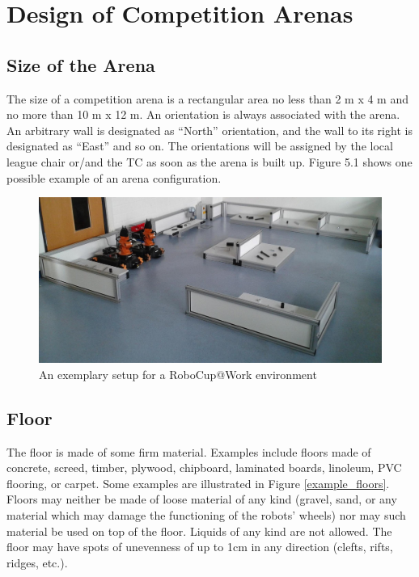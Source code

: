 \section{Design of Competition Arenas}
\subsection{Size of the Arena}

The size of a competition arena is a rectangular area no less than 2 m x 4 m and no more than 10 m x 12 m.
An orientation is always associated with the arena. An arbitrary wall is designated as “North” orientation, and the wall to its right is designated as “East” and so on. The orientations will be assigned by the local league chair or/and the TC as soon as the arena is built up. Figure 5.1 shows one possible example of an arena configuration.

\begin{figure}
\includegraphics[width= \textwidth ]{../images/example_arena.jpg}
\caption{An exemplary setup for a RoboCup@Work environment}
\end{figure}

\subsection{Floor}
The floor is made of some firm material. Examples include floors made of concrete, screed, timber, plywood, chipboard, laminated boards, linoleum, PVC flooring, or carpet. Some examples are illustrated in Figure \ref{example_floors}. Floors may neither be made of loose material of any kind (gravel, sand, or any material which may damage the functioning of the robots’ wheels) nor may such material be used on top of the floor. Liquids of any kind are not allowed. The floor may have spots of unevenness of up to 1cm in any direction (clefts, rifts, ridges, etc.).

